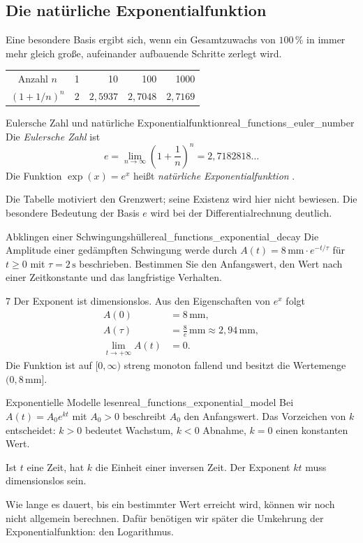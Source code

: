\clearpage
\subsection{Die natürliche Exponentialfunktion}
\label{subsec:real_functions_natural_exponential}
Eine besondere Basis ergibt sich, wenn ein Gesamtzuwachs von $100\,\%$
in immer mehr gleich große, aufeinander aufbauende Schritte zerlegt wird.
\begin{center}
  \renewcommand{\arraystretch}{1.4}
  \begin{tabular}{@{}c|rrrr@{}}
    Anzahl $n$&1&10&100&1000\\
    $(1+1/n)^n$&$2$&$2{,}5937$&$2{,}7048$&$2{,}7169$
  \end{tabular}
\end{center}
\begin{DefinitionBox}{Eulersche Zahl und natürliche Exponentialfunktion}{real_functions_euler_number}
  Die \emph{Eulersche Zahl}  ist
  \[
    e=\lim_{n\to\infty}\left(1+\frac1n\right)^n
      =2{,}7182818\dots
  \]
  Die Funktion $\exp(x)=e^x$ heißt
  \emph{natürliche Exponentialfunktion}
  .
\end{DefinitionBox}
Die Tabelle motiviert den Grenzwert; seine Existenz wird hier nicht
bewiesen. Die besondere Bedeutung der Basis $e$ wird bei der
Differentialrechnung deutlich.

\begin{ExampleBox}{Abklingen einer Schwingungshülle}{real_functions_exponential_decay}
  Die Amplitude einer gedämpften Schwingung werde durch
  $A(t)=8\,\mathrm{mm}\cdot e^{-t/\tau}$ für $t\ge0$ mit
  $\tau=2\,\mathrm{s}$ beschrieben.
  Bestimmen Sie den Anfangswert, den Wert nach einer Zeitkonstante
  und das langfristige Verhalten.
  \begin{ClozeArea}[34]{7}
    Der Exponent ist dimensionslos. Aus den Eigenschaften von $e^x$ folgt
    \[
      \begin{aligned}
        A(0)&=8\,\mathrm{mm},\\
        A(\tau)&=\frac8e\,\mathrm{mm}\approx2{,}94\,\mathrm{mm},\\
        \lim_{t\to+\infty}A(t)&=0.
      \end{aligned}
    \]
    Die Funktion ist auf $[0,\infty)$ streng monoton fallend und besitzt
    die \textcolor{green!55!black}{Wertemenge} $(0,8\,\mathrm{mm}]$.
  \end{ClozeArea}
\end{ExampleBox}

\begin{KeyPointBox}{Exponentielle Modelle lesen}{real_functions_exponential_model}
  Bei $A(t)=A_0e^{kt}$ mit $A_0>0$ beschreibt $A_0$ den Anfangswert.
  Das Vorzeichen von $k$ entscheidet:
  $k>0$ bedeutet Wachstum, $k<0$ Abnahme, $k=0$ einen konstanten Wert.

  Ist $t$ eine Zeit, hat $k$ die Einheit einer inversen Zeit.
  Der Exponent $kt$ muss dimensionslos sein.
\end{KeyPointBox}
Wie lange es dauert, bis ein bestimmter Wert erreicht wird, können wir
noch nicht allgemein berechnen. Dafür benötigen wir später die
Umkehrung der Exponentialfunktion: den Logarithmus.
